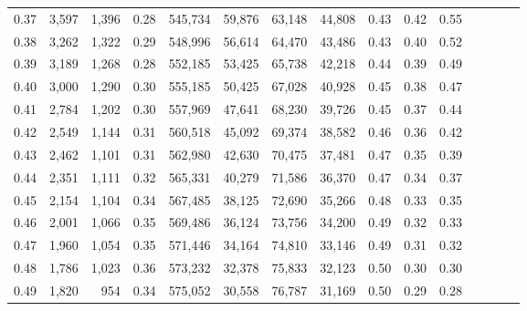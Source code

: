 \begin{tabular}{rrrcrrrrrrrrrrr}
0.37 &   3,597 &  1,396 &                                       0.28 &  545,734 &   59,876 &   63,148 &   44,808 &  0.43 &  0.42 &                         0.55 \\
0.38 &   3,262 &  1,322 &                                       0.29 &  548,996 &   56,614 &   64,470 &   43,486 &  0.43 &  0.40 &                         0.52 \\
0.39 &   3,189 &  1,268 &                                       0.28 &  552,185 &   53,425 &   65,738 &   42,218 &  0.44 &  0.39 &                         0.49 \\
0.40 &   3,000 &  1,290 &                                       0.30 &  555,185 &   50,425 &   67,028 &   40,928 &  0.45 &  0.38 &                         0.47 \\
0.41 &   2,784 &  1,202 &                                       0.30 &  557,969 &   47,641 &   68,230 &   39,726 &  0.45 &  0.37 &                         0.44 \\
0.42 &   2,549 &  1,144 &                                       0.31 &  560,518 &   45,092 &   69,374 &   38,582 &  0.46 &  0.36 &                         0.42 \\
0.43 &   2,462 &  1,101 &                                       0.31 &  562,980 &   42,630 &   70,475 &   37,481 &  0.47 &  0.35 &                         0.39 \\
0.44 &   2,351 &  1,111 &                                       0.32 &  565,331 &   40,279 &   71,586 &   36,370 &  0.47 &  0.34 &                         0.37 \\
0.45 &   2,154 &  1,104 &                                       0.34 &  567,485 &   38,125 &   72,690 &   35,266 &  0.48 &  0.33 &                         0.35 \\
0.46 &   2,001 &  1,066 &                                       0.35 &  569,486 &   36,124 &   73,756 &   34,200 &  0.49 &  0.32 &                         0.33 \\
0.47 &   1,960 &  1,054 &                                       0.35 &  571,446 &   34,164 &   74,810 &   33,146 &  0.49 &  0.31 &                         0.32 \\
0.48 &   1,786 &  1,023 &                                       0.36 &  573,232 &   32,378 &   75,833 &   32,123 &  0.50 &  0.30 &                         0.30 \\
0.49 &   1,820 &    954 &                                       0.34 &  575,052 &   30,558 &   76,787 &   31,169 &  0.50 &  0.29 &                         0.28 \\

\end{tabular}
